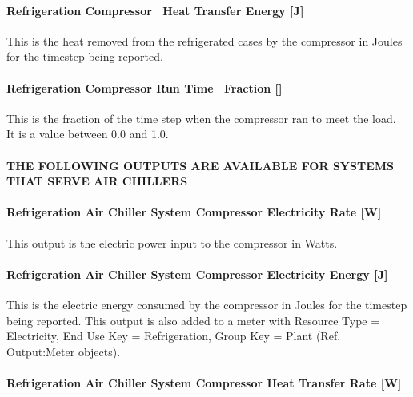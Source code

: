 \paragraph{Refrigeration Compressor~ Heat Transfer Energy {[}J{]}}\label{refrigeration-compressor-heat-transfer-energy-j}

This is the heat removed from the refrigerated cases by the compressor in Joules for the timestep being reported.

\paragraph{Refrigeration Compressor Run Time~ Fraction {[]}}\label{refrigeration-compressor-run-time-fraction}

This is the fraction of the time step when the compressor ran to meet the load.~ It is a value between 0.0 and 1.0.

\paragraph{THE FOLLOWING OUTPUTS ARE AVAILABLE FOR SYSTEMS THAT SERVE AIR CHILLERS}\label{the-following-outputs-are-available-for-systems-that-serve-air-chillers-1}

\paragraph{Refrigeration Air Chiller System Compressor Electricity Rate {[}W{]}}\label{refrigeration-air-chiller-system-compressor-electric-power-w}

This output is the electric power input to the compressor in Watts.

\paragraph{Refrigeration Air Chiller System Compressor Electricity Energy {[}J{]}}\label{refrigeration-air-chiller-system-compressor-electric-energy-j}

This is the electric energy consumed by the compressor in Joules for the timestep being reported. This output is also added to a meter with Resource Type = Electricity, End Use Key = Refrigeration, Group Key = Plant (Ref. Output:Meter objects).

\paragraph{Refrigeration Air Chiller System Compressor Heat Transfer Rate {[}W{]}}\label{refrigeration-air-chiller-system-compressor-heat-transfer-rate-w}

